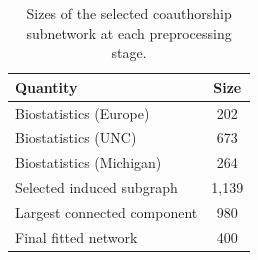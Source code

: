 \documentclass[12pt]{article}
\begin{document}
\begin{table}[h]
	\centering
	\small
	\begin{tabular}{lc}
		\toprule
		Quantity & Size \\
		\midrule
		Biostatistics (Europe) & 202 \\
		Biostatistics (UNC) & 673 \\
		Biostatistics (Michigan) & 264 \\
		Selected induced subgraph & 1{,}139 \\
		Largest connected component & 980 \\
		Final fitted network & 400 \\
		\bottomrule
	\end{tabular}
	\caption{Sizes of the selected coauthorship subnetwork at each preprocessing stage.}
	\label{tab:coauthorship-preprocess}
\end{table}
\end{document}
